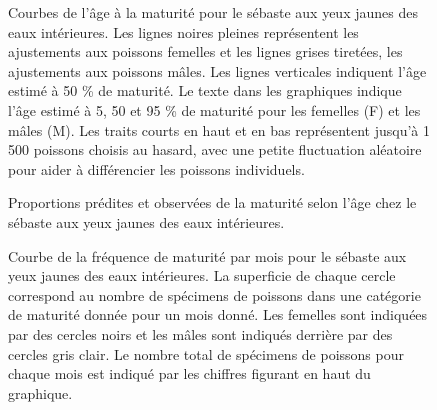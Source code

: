 \documentclass[11pt]{book}
\begin{document}
\begin{figure}[htb]

{\centering {} 

}

\caption{Courbes de l'âge à la maturité pour le sébaste aux yeux jaunes des eaux intérieures. Les lignes noires pleines représentent les ajustements aux poissons femelles et les lignes grises tiretées, les ajustements aux poissons mâles. Les lignes verticales indiquent l'âge estimé à 50 \% de maturité. Le texte dans les graphiques indique l'âge estimé à 5, 50 et 95 \% de maturité pour les femelles (F) et les mâles (M). Les traits courts en haut et en bas représentent jusqu'à 1 500 poissons choisis au hasard, avec une petite fluctuation aléatoire pour aider à différencier les poissons individuels.}\label{fig:percent-maturity}
\end{figure}

\begin{figure}[htb]

{\centering {} 

}

\caption{Proportions prédites et observées de la maturité selon l'âge chez le sébaste aux yeux jaunes des eaux intérieures.}\label{fig:prop-mature}
\end{figure}

\begin{figure}[htb]

{\centering {} 

}

\caption{Courbe de la fréquence de maturité par mois pour le sébaste aux yeux jaunes des eaux intérieures. La superficie de chaque cercle correspond au nombre de spécimens de poissons dans une catégorie de maturité donnée pour un mois donné. Les femelles sont indiquées par des cercles noirs et les mâles sont indiqués derrière par des cercles gris clair. Le nombre total de spécimens de poissons pour chaque mois est indiqué par les chiffres figurant en haut du graphique.}\label{fig:mat-months}
\end{figure}
\clearpage
\end{document}
